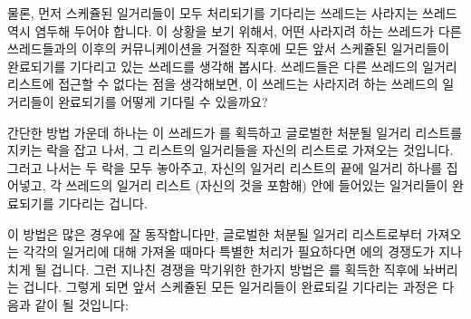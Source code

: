 {	물론, 먼저 스케쥴된 일거리들이 모두 처리되기를 기다리는 쓰레드는
	사라지는 쓰레드 역시 염두해 두어야 합니다.
	이 상황을 보기 위해서, 어떤 사라지려 하는 쓰레드가 다른 쓰레드들과의
	이후의 커뮤니케이션을 거절한 직후에 모든 앞서 스케쥴된 일거리들이
	완료되기를 기다리고 있는 쓰레드를 생각해 봅시다.
	쓰레드들은 다른 쓰레드의 일거리 리스트에 접근할 수 없다는 점을
	생각해보면, 이 쓰레드는 사라지려 하는 쓰레드의 일거리들이 완료되기를
	어떻게 기다릴 수 있을까요?

	간단한 방법 가운데 하나는 이 쓰레드가  를 획득하고 글로벌한
	처분될 일거리 리스트를 지키는 락을 잡고 나서, 그 리스트의 일거리들을
	자신의 리스트로 가져오는 것입니다.
	그러고 나서는 두 락을 모두 놓아주고, 자신의 일거리 리스트의 끝에 일거리
	하나를 집어넣고, 각 쓰레드의 일거리 리스트 (자신의 것을 포함해) 안에
	들어있는 일거리들이 완료되기를 기다리는 겁니다.

	이 방법은 많은 경우에 잘 동작합니다만, 글로벌한 처분될 일거리
	리스트로부터 가져오는 각각의 일거리에 대해 가져올 때마다 특별한 처리가
	필요하다면  에의 경쟁도가 지나치게 될 겁니다.
	그런 지나친 경쟁을 막기위한 한가지 방법은  를 획득한 직후에
	놔버리는 겁니다.
	그렇게 되면 앞서 스케쥴된 모든 일거리들이 완료되길 기다리는 과정은
	다음과 같이 될 것입니다:

}
